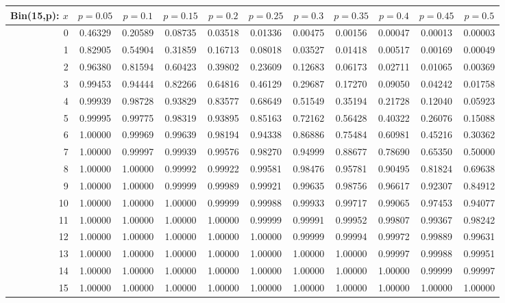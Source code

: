 \vspace{8pt minus 6pt}
\begin{tabular}{@{\extracolsep{-2pt}}|r|c|c|c|c|c|c|c|c|c|c|}
\hline
Bin(15,p): $x$
   & $p\!=\!0.05$& $p\!=\!0.1$& $p\!=\!0.15$& $p\!=\!0.2$& $p\!=\!0.25$& $p\!=\!0.3$& $p\!=\!0.35$& $p\!=\!0.4$& $p\!=\!0.45$& $p\!=\!0.5$\\\hline
  0&0.46329&0.20589&0.08735&0.03518&0.01336&0.00475&0.00156&0.00047&0.00013&0.00003\\
  1&0.82905&0.54904&0.31859&0.16713&0.08018&0.03527&0.01418&0.00517&0.00169&0.00049\\
  2&0.96380&0.81594&0.60423&0.39802&0.23609&0.12683&0.06173&0.02711&0.01065&0.00369\\
  3&0.99453&0.94444&0.82266&0.64816&0.46129&0.29687&0.17270&0.09050&0.04242&0.01758\\
  4&0.99939&0.98728&0.93829&0.83577&0.68649&0.51549&0.35194&0.21728&0.12040&0.05923\\
  5&0.99995&0.99775&0.98319&0.93895&0.85163&0.72162&0.56428&0.40322&0.26076&0.15088\\
  6&1.00000&0.99969&0.99639&0.98194&0.94338&0.86886&0.75484&0.60981&0.45216&0.30362\\
  7&1.00000&0.99997&0.99939&0.99576&0.98270&0.94999&0.88677&0.78690&0.65350&0.50000\\
  8&1.00000&1.00000&0.99992&0.99922&0.99581&0.98476&0.95781&0.90495&0.81824&0.69638\\
  9&1.00000&1.00000&0.99999&0.99989&0.99921&0.99635&0.98756&0.96617&0.92307&0.84912\\
 10&1.00000&1.00000&1.00000&0.99999&0.99988&0.99933&0.99717&0.99065&0.97453&0.94077\\
 11&1.00000&1.00000&1.00000&1.00000&0.99999&0.99991&0.99952&0.99807&0.99367&0.98242\\
 12&1.00000&1.00000&1.00000&1.00000&1.00000&0.99999&0.99994&0.99972&0.99889&0.99631\\
 13&1.00000&1.00000&1.00000&1.00000&1.00000&1.00000&1.00000&0.99997&0.99988&0.99951\\
 14&1.00000&1.00000&1.00000&1.00000&1.00000&1.00000&1.00000&1.00000&0.99999&0.99997\\
 15&1.00000&1.00000&1.00000&1.00000&1.00000&1.00000&1.00000&1.00000&1.00000&1.00000\\
\hline
\end{tabular}

